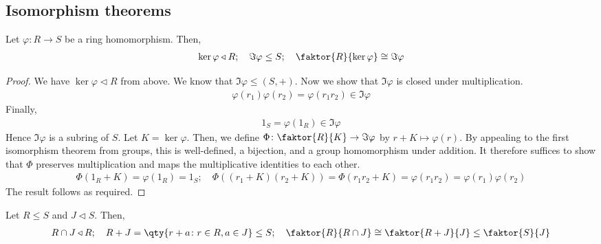 \subsection{Isomorphism theorems}
\begin{theorem}
	Let $\varphi \colon R \to S$ be a ring homomorphism.
	Then,
	\begin{align*}
		\ker \varphi \triangleleft R;\quad \Im \varphi \leq S;\quad \faktor{R}{\ker \varphi} \cong \Im \varphi
	\end{align*}
\end{theorem}
\begin{proof}
	We have $\ker \varphi \triangleleft R$ from above.
	We know that $\Im \varphi \leq (S, +)$.
	Now we show that $\Im \varphi$ is closed under multiplication.
	\begin{align*}
		\varphi(r_1) \varphi(r_2) = \varphi(r_1 r_2) \in \Im \varphi
	\end{align*}
	Finally,
	\begin{align*}
		1_S = \varphi(1_R) \in \Im \varphi
	\end{align*}
	Hence $\Im \varphi$ is a subring of $S$.
	Let $K = \ker \varphi$.
	Then, we define $\Phi \colon \faktor{R}{K} \to \Im \varphi$ by $r+K \mapsto \varphi(r)$.
	By appealing to the first isomorphism theorem from groups, this is well-defined, a bijection, and a group homomorphism under addition.
	It therefore suffices to show that $\Phi$ preserves multiplication and maps the multiplicative identities to each other.
	\begin{align*}
		\Phi(1_R + K) = \varphi(1_R) = 1_S;\quad \Phi((r_1+K)(r_2+K)) = \Phi(r_1 r_2 +K) = \varphi(r_1 r_2) = \varphi(r_1) \varphi(r_2)
	\end{align*}
	The result follows as required.
\end{proof}
\begin{theorem}
	Let $R \leq S$ and $J \triangleleft S$.
	Then,
	\begin{align*}
		R \cap J \triangleleft R;\quad R + J = \qty{r+a \colon r\in R, a \in J} \leq S;\quad \faktor{R}{R \cap J} \cong \faktor{R+J}{J} \leq \faktor{S}{J}
	\end{align*}
\end{theorem}
